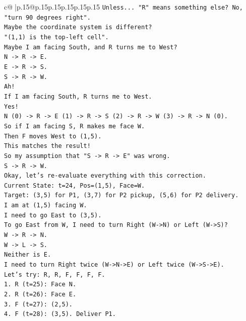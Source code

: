 \documentclass{article}
\begin{document}
{\begin{supertabular}{c@{$\;$}|p{.15\linewidth}@{}p{.15\linewidth}p{.15\linewidth}p{.15\linewidth}p{.15\linewidth}p{.15\linewidth}}
{{{\texttt{Unless... "R" means something else? No, "turn 90 degrees right".} \\
\texttt{Maybe the coordinate system is different?} \\
\texttt{"(1,1) is the top{-}left cell".} \\
\texttt{Maybe I am facing South, and R turns me to West?} \\
\texttt{N {-}> R {-}> E.} \\
\texttt{E {-}> R {-}> S.} \\
\texttt{S {-}> R {-}> W.} \\
\texttt{Ah!} \\
\texttt{If I am facing South, R turns me to West.} \\
\texttt{Yes!} \\
\texttt{N (0) {-}> R {-}> E (1) {-}> R {-}> S (2) {-}> R {-}> W (3) {-}> R {-}> N (0).} \\
\texttt{So if I am facing S, R makes me face W.} \\
\texttt{Then F moves West to (1,5).} \\
\texttt{This matches the result!} \\
\texttt{So my assumption that "S {-}> R {-}> E" was wrong.} \\
\texttt{S {-}> R {-}> W.} \\
\texttt{Okay, let's re{-}evaluate everything with this correction.} \\
\texttt{Current State: t=24, Pos=(1,5), Face=W.} \\
\texttt{Target: (3,5) for P1, (3,7) for P2 pickup, (5,6) for P2 delivery.} \\
\texttt{I am at (1,5) facing W.} \\
\texttt{I need to go East to (3,5).} \\
\texttt{To go East from W, I need to turn Right (W{-}>N) or Left (W{-}>S)?} \\
\texttt{W {-}> R {-}> N.} \\
\texttt{W {-}> L {-}> S.} \\
\texttt{Neither is E.} \\
\texttt{I need to turn Right twice (W{-}>N{-}>E) or Left twice (W{-}>S{-}>E).} \\
\texttt{Let's try: R, R, F, F, F, F.} \\
\texttt{1. R (t=25): Face N.} \\
\texttt{2. R (t=26): Face E.} \\
\texttt{3. F (t=27): (2,5).} \\
\texttt{4. F (t=28): (3,5). Deliver P1.} \\
}}}
\end{supertabular}}
\end{document}
